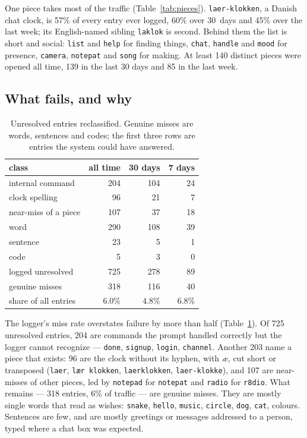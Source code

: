 \documentclass[10pt,letterpaper,twocolumn]{article}
\newcommand{\code}[1]{\texttt{#1}}
\begin{document}
One piece takes most of the traffic (Table~\ref{tab:pieces}).
\code{laer-klokken}, a Danish chat clock, is 57\% of every entry ever logged,
60\% over 30~days and 45\% over the last week; its English-named sibling
\code{laklok} is second. Behind them the list is short and social:
\code{list} and \code{help} for finding things, \code{chat}, \code{handle}
and \code{mood} for presence, \code{camera}, \code{notepat} and \code{song}
for making. At least 140 distinct pieces were opened all time, 139 in the last
30 days and 85 in the last week.

\subsection{What fails, and why}

\begin{table}[t]
\centering
\small
\begin{tabular}{@{}lrrr@{}}
\toprule
class & all time & 30 days & 7 days\\
\midrule
internal command & 204 & 104 & 24\\
clock spelling & 96 & 21 & 7\\
near-miss of a piece & 107 & 37 & 18\\
word & 290 & 108 & 39\\
sentence & 23 & 5 & 1\\
code & 5 & 3 & 0\\
\midrule
logged unresolved & 725 & 278 & 89\\
genuine misses & 318 & 116 & 40\\
\quad share of all entries & 6.0\% & 4.8\% & 6.8\%\\
\bottomrule
\end{tabular}
\caption{Unresolved entries reclassified. Genuine misses are words,
sentences and codes; the first three rows are entries the system could have
answered.}
\label{tab:misses}
\end{table}

The logger's miss rate overstates failure by more than half
(Table~\ref{tab:misses}). Of 725 unresolved entries, 204 are commands the
prompt handled correctly but the logger cannot recognize --- \code{done},
\code{signup}, \code{login}, \code{channel}. Another 203 name a piece that
exists: 96 are the clock without its hyphen, with \emph{\ae}, cut short or
transposed (\code{laer}, \code{lær klokken}, \code{laerklokken},
\code{laer-klokke}), and 107 are near-misses of other pieces, led by
\code{notepad} for \code{notepat} and \code{radio} for \code{r8dio}. What
remains --- 318 entries, 6\% of traffic --- are genuine misses. They are
mostly single words that read as wishes: \code{snake}, \code{hello},
\code{music}, \code{circle}, \code{dog}, \code{cat}, colours. Sentences are
few, and are mostly greetings or messages addressed to a person, typed where a
chat box was expected.
\end{document}
